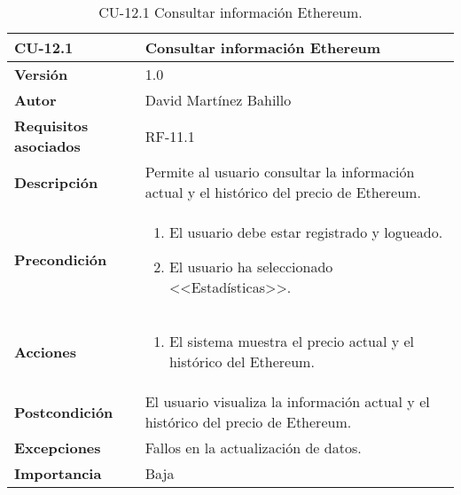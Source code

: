 \begin{table}[p]
	\centering
	\begin{tabularx}{\linewidth}{ p{} p{} }
		\toprule
		\textbf{CU-12.1}  & \textbf{Consultar información Ethereum}\\
		\midrule
		\textbf{Versión}              & 1.0    \\
		\textbf{Autor}                & David Martínez Bahillo \\
		\textbf{Requisitos asociados} & RF-11.1 \\
		\textbf{Descripción}          & Permite al usuario consultar la información actual y el histórico del precio de Ethereum. \\
		\textbf{Precondición}         &  
		\begin{enumerate}
			\item El usuario debe estar registrado y logueado.
			\item El usuario ha seleccionado <<Estadísticas>>.
		\end{enumerate}\\
		\textbf{Acciones}             &
		\begin{enumerate}
			\item El sistema muestra el precio actual y el histórico del Ethereum.
		\end{enumerate}\\
		\textbf{Postcondición}        & El usuario visualiza la información actual y el histórico del precio de Ethereum. \\
		\textbf{Excepciones}          & Fallos en la actualización de datos. \\
		\textbf{Importancia}          & Baja \\
		\bottomrule
	\end{tabularx}
	\caption{CU-12.1 Consultar información Ethereum.}
\end{table}


